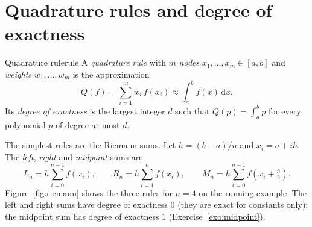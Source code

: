 \documentclass[11pt,a4paper,twoside,openright]{book}
\newcommand{\dd}{\,\mathrm{d}}
\newcounter{exo}[chapter]
\begin{document}
\section{Quadrature rules and degree of exactness}
\begin{definition}{Quadrature rule}{rule}
A \emph{quadrature rule} with $m$ \emph{nodes} $x_1,\dots,x_m\in[a,b]$ and \emph{weights} $w_1,\dots,w_m$ is the approximation
\[
  Q(f)=\sum_{i=1}^{m} w_i\,f(x_i)\approx\int_a^b f(x)\dd x .
\]
Its \emph{degree of exactness} is the largest integer $d$ such that $Q(p)=\int_a^b p$ for every polynomial $p$ of degree at most $d$.
\end{definition}

The simplest rules are the Riemann sums. Let $h=(b-a)/n$ and $x_i=a+ih$. The \emph{left}, \emph{right} and \emph{midpoint} sums are
\begin{equation}
  L_n=h\sum_{i=0}^{n-1}f(x_i),\qquad
  R_n=h\sum_{i=1}^{n}f(x_i),\qquad
  M_n=h\sum_{i=0}^{n-1}f\!\left(x_i+\tfrac h2\right).
  \label{eq:riemann}
\end{equation}
Figure~\ref{fig:riemann} shows the three rules for $n=4$ on the running example.
The left and right sums have degree of exactness $0$ (they are exact for constants only); the midpoint sum has degree of exactness $1$ (Exercise~\ref{exo:midpoint}).
\end{document}
